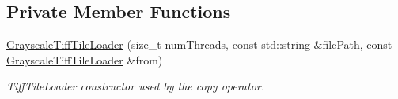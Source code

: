 \subsection*{Private Member Functions}
\begin{DoxyCompactItemize}
\item 
\hyperlink{classfi_1_1GrayscaleTiffTileLoader_a906657dfe15c3b4f807b59d9ef11b3d0}{Grayscale\+Tiff\+Tile\+Loader} (size\+\_\+t num\+Threads, const std\+::string \&file\+Path, const \hyperlink{classfi_1_1GrayscaleTiffTileLoader}{Grayscale\+Tiff\+Tile\+Loader} \&from)
\begin{DoxyCompactList}\small\item\em Tiff\+Tile\+Loader constructor used by the copy operator. \end{DoxyCompactList}\end{DoxyCompactItemize}
